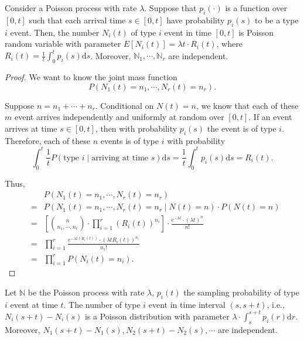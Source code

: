 \begin{corollary}[推論]
Consider a Poisson process with rate $ \lambda $. Suppose that $ p_{i}(\cdot) $ is a function over $ [0, t] $ such that each arrival time $ s \in [0, t] $ have probability $ p_{i}(s) $ to be a type $ i $ event. Then, the number $ N_{i}(t) $ of type $ i $ event in time $ [0, t] $ is Poisson random variable with parameter $ E[N_{i}(t)] = \lambda t \cdot R_{i}(t) $, where $ R_{i}(t) = \frac{1}{t} \int_{0}^{t} p_{i}(s) \mathrm{d}s $. Moreover, $ \mathbb{N}_{1}, \cdots, \mathbb{N}_{r} $ are independent.

\begin{proof}
We want to know the joint mass function
\[ P(N_{1}(t) = n_{1}, \cdots, N_{r}(t) = n_{r}). \]

Suppose $ n = n_{1} + \cdots + n_{r} $. Conditional on $ N(t) = n $, we know that each of these $ m $ event arrives independently and uniformly at random over $ [0, t] $. If an event arrives at time $ s \in [0, t] $, then with probability $ p_{i}(s) $ the event is of type $ i $. Therefore, each of these $ n $ events is of type $ i $ with probability
\[ \int_{0}^{t} \frac{1}{t} P(\text{type } i \mid \text{arriving at time } s) \mathrm{d}s = \frac{1}{t} \int_{0}^{t}  p_{i}(s) \mathrm{d}s = R_{i}(t). \]

Thus,
\begin{eqnarray*}
  &   & P(N_{1}(t) = n_{1}, \cdots, N_{r}(t) = n_{r}) \\
  & = & P(N_{1}(t) = n_{1}, \cdots, N_{r}(t) = n_{r} \mid N(t) = n) \cdot P(N(t) = n) \\
  & = & \left[ {{n}\choose{n_{1}, \cdots, n_{r}}} \cdot \prod_{i = 1}^{r} (R_{i}(t))^{n_{i}} \right] \cdot \frac{e^{-\lambda t} \cdot (\lambda t)^{n}}{n!} \\
  & = & \prod_{i = 1}^{r} \frac{e^{-\lambda t (R_{i}(t))} \cdot (\lambda t R_{i}(t))^{n_{i}}}{n_{i}!} \\
  & = & \prod_{i = 1}^{r} P(N_{i}(t) = n_{i}).
\end{eqnarray*}
\end{proof}
\end{corollary}

\begin{corollary}[推廣推論] \label{cor:ext_cor}
Let $ \mathbb{N} $ be the Poisson process with rate $ \lambda $, $ p_{i}(t) $ the sampling probability of type $ i $ event at time $ t $. The number of type $ i $ event in time interval $ (s, s + t) $, i.e., $ N_{i}(s + t) - N_{i}(s) $ is a Poisson distribution with parameter $ \lambda \cdot \int_{s}^{s + t} p_{i}(r) \mathrm{d}r $. Moreover, $ N_{1}(s + t) - N_{1}(s), N_{2}(s + t) - N_{2}(s), \cdots $ are independent.
\end{corollary}

